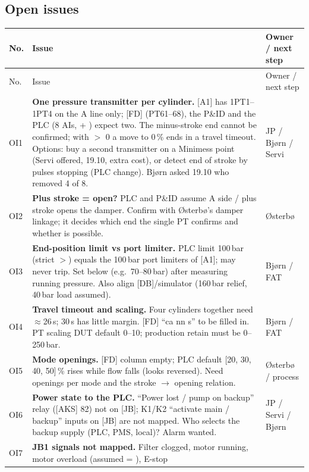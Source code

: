 \documentclass[11pt,a4paper]{article}
\begin{document}
\subsection{Open issues}
\begin{small}
\begin{longtable}{@{}lP{100mm}P{30mm}@{}}
\toprule
No. & Issue & Owner / next step \\
\midrule
\endfirsthead
\toprule
No. & Issue & Owner / next step \\
\midrule
\endhead
\bottomrule
\endfoot
OI1 & \textbf{One pressure transmitter per cylinder.} [A1] has 1PT1--1PT4 on the A line only; [FD] (PT61--68),
  the P\&ID and the PLC (8 AIs,  + ) expect two. The minus-stroke end cannot be confirmed;
  with  $>$ 0 a move to 0\,\% ends in a travel timeout. Options: buy a second transmitter on a Minimess
  point (Servi offered, 19.10, extra cost), or detect end of stroke by pulses stopping (PLC change). Bjørn asked 19.10 who
  removed 4 of 8. & JP / Bjørn / Servi \\
OI2 & \textbf{Plus stroke = open?} PLC and P\&ID assume A side / plus stroke opens the damper. Confirm with Østerbø's damper
  linkage; it decides which end the single PT confirms and whether  is possible. & Østerbø \\
OI3 & \textbf{End-position limit vs port limiter.} PLC limit 100\,bar (strict $>$) equals the 100\,bar port limiters of [A1];
  may never trip. Set below (e.g.\ 70--80\,bar) after measuring running pressure. Also align [DB]/simulator (160\,bar relief,
  40\,bar load assumed). & Bjørn / FAT \\
OI4 & \textbf{Travel timeout and scaling.} Four cylinders together need $\approx$26\,s;  30\,s has little margin.
  [FD] ``ca nn s'' to be filled in. PT scaling DUT default 0--10; production retain must be 0--250\,bar. & Bjørn / FAT \\
OI5 & \textbf{Mode openings.} [FD] column empty; PLC default [20, 30, 40, 50]\,\% rises while flow falls (looks reversed). Need
  openings per mode and the stroke $\to$ opening relation. & Østerbø / process \\
OI6 & \textbf{Power state to the PLC.} ``Power lost / pump on backup'' relay ([AKS] 82) not on [JB]; K1/K2 ``activate main / backup''
  inputs on [JB] are not mapped. Who selects the backup supply (PLC, PMS, local)? Alarm wanted. & JP / Servi / Bjørn \\
OI7 & \textbf{JB1 signals not mapped.} Filter clogged, motor running, motor overload (assumed = ), E-stop

\end{longtable}
\end{small}
\end{document}
